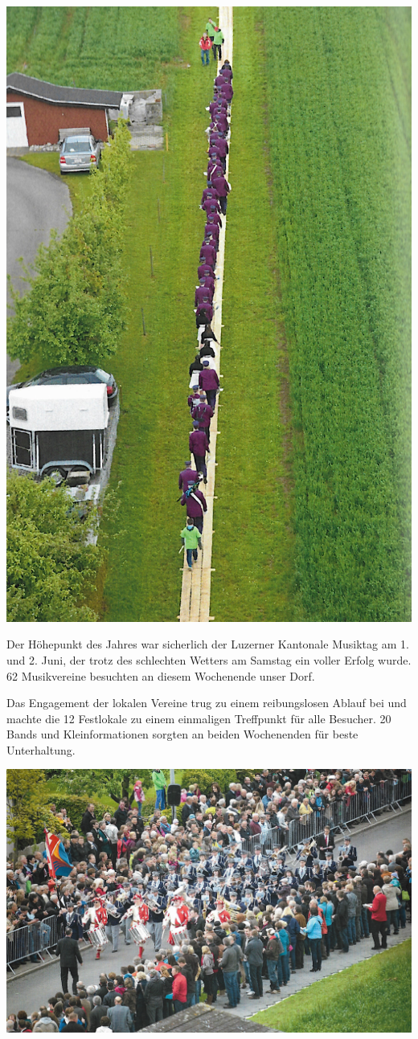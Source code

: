 \begin{history}
    \begin{MulticolFigure}
        \centering
        \includegraphics[width=0.6\linewidth]{./chap/2001-2024/2013/Unterwegs-zum-Start.jpg}
    \end{MulticolFigure}

    \vfill
    \columnbreak

    Der Höhepunkt des Jahres war sicherlich der Luzerner Kantonale Musiktag am
    1. und 2. Juni, der trotz des schlechten Wetters am Samstag ein voller
    Erfolg wurde. 62 Musikvereine besuchten an diesem Wochenende unser Dorf.

    Das Engagement der lokalen Vereine trug zu einem reibungslosen Ablauf bei
    und machte die 12 Festlokale zu einem einmaligen Treffpunkt für alle
    Besucher. 20 Bands und Kleinformationen sorgten an beiden Wochenenden für
    beste Unterhaltung.

    \begin{MulticolFigure}
        \centering
        \includegraphics[width=0.93\linewidth]{./chap/2001-2024/2013/Marschmusikstrecke.jpg}
    \end{MulticolFigure}



\end{history}
